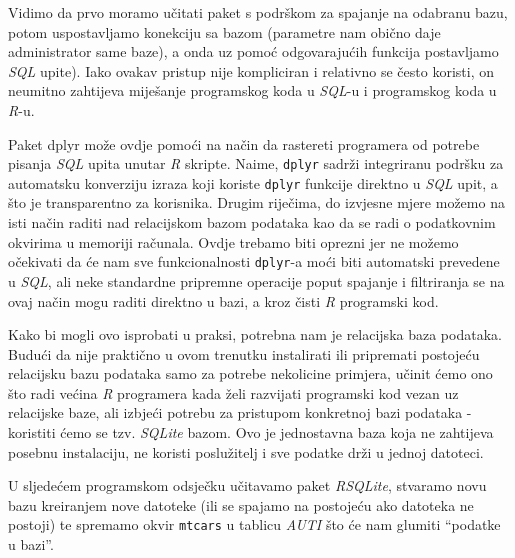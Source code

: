 \documentclass[]{book}
\theoremstyle{definition}
\theoremstyle{definition}
\theoremstyle{definition}
\theoremstyle{remark}
\begin{document}
Vidimo da prvo moramo učitati paket s podrškom za spajanje na odabranu
bazu, potom uspostavljamo konekciju sa bazom (parametre nam obično daje
administrator same baze), a onda uz pomoć odgovarajućih funkcija
postavljamo \emph{SQL} upite). Iako ovakav pristup nije kompliciran i
relativno se često koristi, on neumitno zahtijeva miješanje programskog
koda u \emph{SQL}-u i programskog koda u \emph{R}-u.

Paket dplyr može ovdje pomoći na način da rastereti programera od
potrebe pisanja \emph{SQL} upita unutar \emph{R} skripte. Naime,
\texttt{dplyr} sadrži integriranu podršku za automatsku konverziju
izraza koji koriste \texttt{dplyr} funkcije direktno u \emph{SQL} upit,
a što je transparentno za korisnika. Drugim riječima, do izvjesne mjere
možemo na isti način raditi nad relacijskom bazom podataka kao da se
radi o podatkovnim okvirima u memoriji računala. Ovdje trebamo biti
oprezni jer ne možemo očekivati da će nam sve funkcionalnosti
\texttt{dplyr}-a moći biti automatski prevedene u \emph{SQL}, ali neke
standardne pripremne operacije poput spajanje i filtriranja se na ovaj
način mogu raditi direktno u bazi, a kroz čisti \emph{R} programski kod.

Kako bi mogli ovo isprobati u praksi, potrebna nam je relacijska baza
podataka. Budući da nije praktično u ovom trenutku instalirati ili
pripremati postojeću relacijsku bazu podataka samo za potrebe nekolicine
primjera, učinit ćemo ono što radi većina \emph{R} programera kada želi
razvijati programski kod vezan uz relacijske baze, ali izbjeći potrebu
za pristupom konkretnoj bazi podataka - koristiti ćemo se tzv.
\emph{SQLite }bazom. Ovo je jednostavna baza koja ne zahtijeva posebnu
instalaciju, ne koristi poslužitelj i sve podatke drži u jednoj
datoteci.

U sljedećem programskom odsječku učitavamo paket \emph{RSQLite},
stvaramo novu bazu kreiranjem nove datoteke (ili se spajamo na postojeću
ako datoteka ne postoji) te spremamo okvir \texttt{mtcars} u tablicu
\emph{AUTI} što će nam glumiti ``podatke u bazi''.
\end{document}
